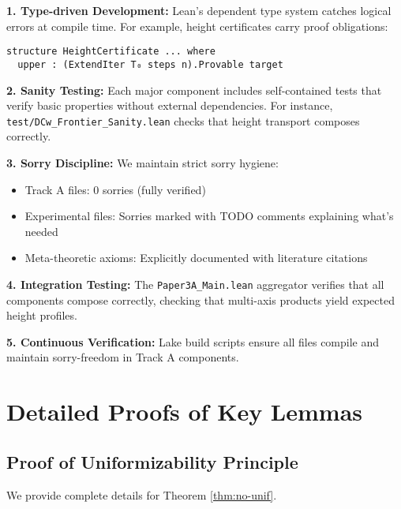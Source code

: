 \documentclass[11pt]{article}
\theoremstyle{plain}
\theoremstyle{definition}
\begin{document}
\textbf{1. Type-driven Development:} Lean's dependent type system catches logical errors at compile time. For example, height certificates carry proof obligations:
\begin{verbatim}
structure HeightCertificate ... where
  upper : (ExtendIter T₀ steps n).Provable target
\end{verbatim}

\textbf{2. Sanity Testing:} Each major component includes self-contained tests that verify basic properties without external dependencies. For instance, \texttt{test/DCw\_Frontier\_Sanity.lean} checks that height transport composes correctly.

\textbf{3. Sorry Discipline:} We maintain strict sorry hygiene:
\begin{itemize}
\item Track A files: 0 sorries (fully verified)
\item Experimental files: Sorries marked with TODO comments explaining what's needed
\item Meta-theoretic axioms: Explicitly documented with literature citations
\end{itemize}

\textbf{4. Integration Testing:} The \texttt{Paper3A\_Main.lean} aggregator verifies that all components compose correctly, checking that multi-axis products yield expected height profiles.

\textbf{5. Continuous Verification:} Lake build scripts ensure all files compile and maintain sorry-freedom in Track A components.

\section{Detailed Proofs of Key Lemmas}

\subsection{Proof of Uniformizability Principle}

We provide complete details for Theorem \ref{thm:no-unif}.
\end{document}
